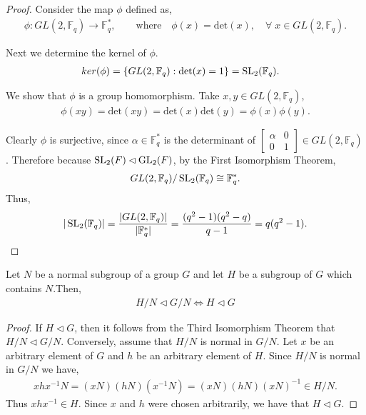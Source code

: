 \begin{proof} 
Consider the map $\phi$ defined as,
\begin{align*} \phi : GL(2,\mathbb{F}_q) \longrightarrow \mathbb{F}^*_q, \qquad \text{where} \quad \! \! \phi(x) = \text{det}(x), \quad \forall \; x \in GL(2,\mathbb{F}_q).
\end{align*}

Next we determine the kernel of $\phi$.
\begin{align*} ker(\phi) &= \{  GL(2,\mathbb{F}_q) : \text{det}(x) = 1 \} = \operatorname{SL}_2(\mathbb{F}_q).
\end{align*}

We show that $\phi$ is a group homomorphism. Take $x,y \in GL(2,\mathbb{F}_q)$,
\begin{align*} 
\phi(xy) = \text{det}(xy) = \text{det}(x) \text{det}(y) = \phi(x) \phi(y).
\end{align*}

Clearly $\phi$ is surjective, since $\alpha \in \mathbb{F}^*_q$ is the determinant of $\begin{bmatrix} \alpha & 0 \\ 0 & 1 \end{bmatrix} \in GL(2,\mathbb{F}_q)$. Therefore because $\operatorname{SL}_2(F) \lhd \operatorname{GL}_2(F)$, by the First Isomorphism Theorem,
\begin{align*} GL(2,\mathbb{F}_q) / \operatorname{SL}_2(\mathbb{F}_q) \cong \mathbb{F}^*_q.
\end{align*}
Thus,
\begin{align*} |\operatorname{SL}_2(\mathbb{F}_q)| =  \frac{|GL(2,\mathbb{F}_q)|}{|\mathbb{F}^*_q|} = \frac{(q^2-1)(q^2-q)}{q-1} = q(q^2-1).
\end{align*}

\end{proof}

\begin{lemma}
    \label{QuotientGroup.comapMk'OrderIso}
Let $N$ be a normal subgroup of a group $G$ and let $H$ be a subgroup of $G$ which contains $N$.Then,
\begin{align*} H / N \vartriangleleft G / N \iff H \vartriangleleft G
\end{align*} 
\end{lemma}

\begin{proof} If $H \vartriangleleft G$, then it follows from the Third Isomorphism Theorem that $ H / N \vartriangleleft G / N$. Conversely, assume that $H / N$ is normal in $G / N$. Let $x$ be an arbitrary element of $G$ and $h$ be an arbitrary element of $H$. Since $H / N$ is normal in $G / N$ we have,
\begin{align*} x h x^{-1}N = (xN)(hN)(x^{-1}N) = (xN)(hN)(xN)^{-1} \in H / N.
\end{align*}
Thus $x h x^{-1} \in H$. Since $x$ and $h$ were chosen arbitrarily, we have that $H \vartriangleleft G$.

\end{proof}


